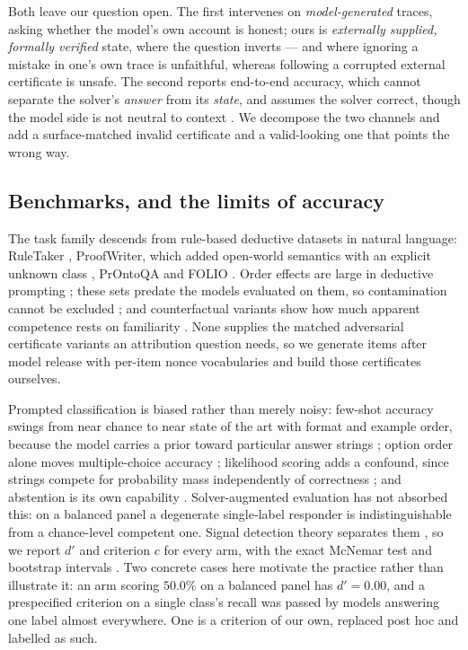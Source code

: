\documentclass[10pt,twocolumn]{article}
\begin{document}
Both leave our question open. The first intervenes on \emph{model-generated}
traces, asking whether the model's own account is honest; ours is
\emph{externally supplied, formally verified} state, where the question inverts
--- and where ignoring a mistake in one's own trace is unfaithful, whereas
following a corrupted external certificate is unsafe. The second reports
end-to-end accuracy, which cannot separate the solver's \emph{answer} from its
\emph{state}, and assumes the solver correct, though the model side is not
neutral to context \citep{shi2023large,xie2023adaptive}. We decompose the two
channels and add a surface-matched invalid certificate and a valid-looking one
that points the wrong way.

\subsection{Benchmarks, and the limits of accuracy}

The task family descends from rule-based deductive datasets in natural language:
RuleTaker \citep{clark2020transformers}, ProofWriter, which added open-world
semantics with an explicit unknown class \citep{tafjord2020proofwriter}, PrOntoQA
\citep{saparov2022language} and FOLIO \citep{han2022folio}. Order effects are
large in deductive prompting \citep{chen2024premise}; these sets predate the
models evaluated on them, so contamination cannot be excluded
\citep{deng2024investigating,golchin2023time}; and counterfactual variants show
how much apparent competence rests on familiarity \citep{wu2023reasoning}. None
supplies the matched adversarial certificate variants an attribution question
needs, so we generate items after model release with per-item nonce vocabularies
and build those certificates ourselves.

Prompted classification is biased rather than merely noisy: few-shot accuracy
swings from near chance to near state of the art with format and example order,
because the model carries a prior toward particular answer strings
\citep{zhao2021calibrate}; option order alone moves multiple-choice accuracy
\citep{pezeshkpour2023large,zheng2023large}; likelihood scoring adds a confound,
since strings compete for probability mass independently of correctness
\citep{holtzman2021surface}; and abstention is its own capability
\citep{kadavath2022language,yin2023large}. Solver-augmented evaluation has not absorbed this: on a balanced panel a
degenerate single-label responder is indistinguishable from a chance-level
competent one. Signal detection theory separates them
\citep{macmillan1991detection,stanislaw1999calculation}, so we report $d'$ and
criterion $c$ for every arm, with the exact McNemar test \citep{mcnemar1947note}
and bootstrap intervals \citep{efron1987better}. Two concrete cases here motivate the practice
rather than illustrate it: an arm scoring $50.0\%$ on a balanced panel has
$d' = 0.00$, and a prespecified criterion on a single class's recall was passed by
models answering one label almost everywhere. One is a criterion of our own,
replaced post hoc and labelled as such.
\end{document}
